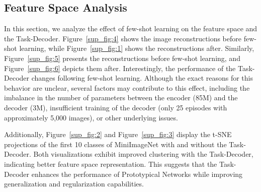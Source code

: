 \begin{table}[htbp]
\centering
\caption{\color{black}Performance comparison of different Meta-Tasks with vanilla Prototypical Networks in a 5-Way 5-Shot 5-Query for 500 episodes.}
\label{sup:7}
\end{table}


\subsection{Feature Space Analysis}
\label{sec:feature_analysis}
{\color{black} In this section, we analyze the effect of few-shot learning on the feature space and the Task-Decoder. Figure~\ref{sup_fig:4} shows the image reconstructions before few-shot learning, while Figure~\ref{sup_fig:1} shows the reconstructions after. Similarly, Figure~\ref{sup_fig:5} presents the reconstructions before few-shot learning, and Figure~\ref{sup_fig:6} depicts them after. Interestingly, the performance of the Task-Decoder changes following few-shot learning. Although the exact reasons for this behavior are unclear, several factors may contribute to this effect, including the imbalance in the number of parameters between the encoder (85M) and the decoder (3M), insufficient training of the decoder (only 25 episodes with approximately 5,000 images), or other underlying issues.

Additionally, Figure~\ref{sup_fig:2} and Figure~\ref{sup_fig:3} display the t-SNE projections of the first 10 classes of MiniImageNet with and without the Task-Decoder. Both visualizations exhibit improved clustering with the Task-Decoder, indicating better feature space representation. This suggests that the Task-Decoder enhances the performance of Prototypical Networks while improving generalization and regularization capabilities.}

